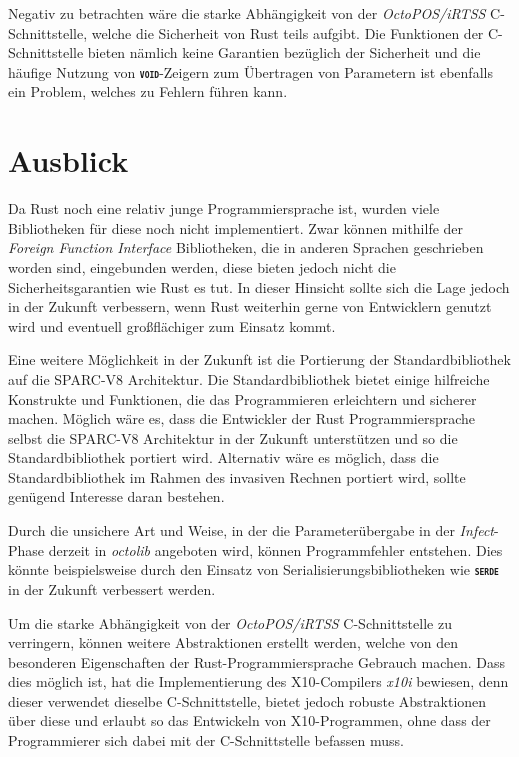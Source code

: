Negativ zu betrachten wäre die starke Abhängigkeit von der \textit{OctoPOS/iRTSS} C-Schnittstelle,
welche die Sicherheit von Rust teils aufgibt. Die Funktionen der C-Schnittstelle bieten nämlich keine Garantien 
bezüglich der Sicherheit und die häufige Nutzung von \texttt{\textsc{\textbf{void}}}-Zeigern zum Übertragen
von Parametern ist ebenfalls ein Problem, welches zu Fehlern führen kann.

\section{Ausblick}

Da Rust noch eine relativ junge Programmiersprache ist, wurden viele Bibliotheken für diese noch nicht implementiert.
Zwar können mithilfe der \textit{Foreign Function Interface} Bibliotheken,
die in anderen Sprachen geschrieben worden sind, eingebunden werden, diese bieten jedoch
nicht die Sicherheitsgarantien wie Rust es tut.
In dieser Hinsicht sollte sich die Lage jedoch in der Zukunft verbessern, wenn Rust
weiterhin gerne von Entwicklern genutzt wird und eventuell großflächiger zum Einsatz kommt.

Eine weitere Möglichkeit in der Zukunft ist die Portierung der Standardbibliothek auf die SPARC-V8 Architektur.
Die Standardbibliothek bietet einige hilfreiche Konstrukte und Funktionen,
die das Programmieren erleichtern und sicherer machen.
Möglich wäre es, dass die Entwickler der Rust Programmiersprache selbst die SPARC-V8 Architektur
in der Zukunft unterstützen und so die Standardbibliothek portiert wird. Alternativ wäre es möglich, dass die 
Standardbibliothek im Rahmen des invasiven Rechnen portiert wird, sollte genügend Interesse daran bestehen.

Durch die unsichere Art und Weise, in der die Parameterübergabe in der \textit{Infect}-Phase derzeit in
\textit{octolib} angeboten wird, können Programmfehler entstehen. Dies könnte beispielsweise durch den Einsatz von
Serialisierungsbibliotheken wie \texttt{\textsc{\textbf{serde}}} in der Zukunft verbessert werden.

Um die starke Abhängigkeit von der \textit{OctoPOS/iRTSS} C-Schnittstelle zu verringern,
können weitere Abstraktionen erstellt werden, welche von den
besonderen Eigenschaften der Rust-Programmiersprache Gebrauch machen.
Dass dies möglich ist, hat die Implementierung des X10-Compilers \textit{x10i} bewiesen,
denn dieser verwendet dieselbe C-Schnittstelle,
bietet jedoch robuste Abstraktionen über diese und erlaubt so
das Entwickeln von X10-Programmen, ohne dass der Programmierer sich dabei mit der C-Schnittstelle befassen muss.
